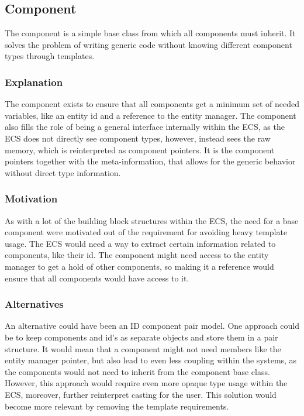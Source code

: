 \subsection{Component}
\label{subsec:detailed_component}
The component is a simple base class from which all components must inherit.
It solves the problem of writing generic code without knowing different component types through templates.

\subsubsection{Explanation}
The component exists to ensure that all components get a minimum set of needed
variables, like an entity id and a reference to the entity manager.
The component also fills the role of being a general interface internally within the ECS, as the ECS does not directly see component types, however, instead sees the raw memory, which is reinterpreted as component pointers.
It is the component pointers together with the meta-information,
that allows for the generic behavior without direct type information.

\subsubsection{Motivation}
As with a lot of the building block structures within the ECS, the need for a base component
were motivated out of the requirement for avoiding heavy template usage.
The ECS would need a way to extract certain information related to components,
like their id. The component might need access to the entity manager
to get a hold of other components, so making it a reference
would ensure that all components would have access to it.

\subsubsection{Alternatives}
An alternative could have been an ID component pair model.
One approach could be to keep components and id's as separate objects and store them in a pair structure.
It would mean that a component might not need members like the entity manager pointer, but also lead to even less coupling within the systems, as the components would not need to inherit from the component base class.
However, this approach would require even more opaque type usage within the ECS,
moreover, further reinterpret casting for the user.
This solution would become more relevant by removing the template requirements.

